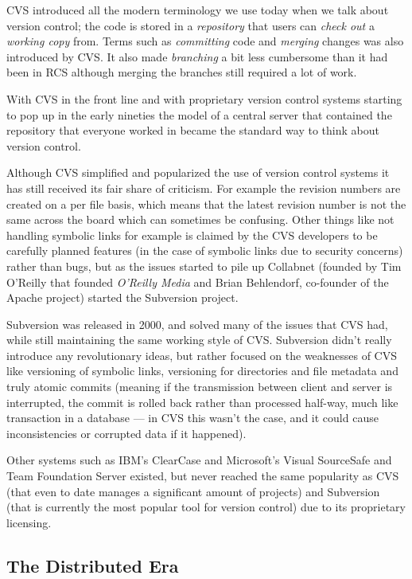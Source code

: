 \documentclass{llncs}
\begin{document}
CVS introduced all the modern terminology we use today when we talk
about version control; the code is stored in a \emph{repository} that
users can \emph{check out} a \emph{working copy} from. Terms such as
\emph{committing} code and \emph{merging} changes was also introduced
by CVS. It also made \emph{branching} a bit less cumbersome than it
had been in RCS although merging the branches still required a lot of
work.

With CVS in the front line and with proprietary version control
systems starting to pop up in the early nineties the model of a
central server that contained the repository that everyone worked in
became the standard way to think about version control.

Although CVS simplified and popularized the use of version control
systems it has still received its fair share of criticism. For example
the revision numbers are created on a per file basis, which means that
the latest revision number is not the same across the board which can
sometimes be confusing. Other things like not handling symbolic links
for example is claimed by the CVS developers to be carefully planned
features (in the case of symbolic links due to security concerns)
rather than bugs, but as the issues started to pile up Collabnet
(founded by Tim O'Reilly that founded \emph{O'Reilly Media} and Brian
Behlendorf, co-founder of the Apache project) started the Subversion
project.

Subversion was released in 2000, and solved many of the issues that
CVS had, while still maintaining the same working style of
CVS. Subversion didn't really introduce any revolutionary ideas, but
rather focused on the weaknesses of CVS like versioning of symbolic
links, versioning for directories and file metadata and truly atomic
commits (meaning if the transmission between client and server is
interrupted, the commit is rolled back rather than processed half-way,
much like transaction in a database --- in CVS this wasn't the case,
and it could cause inconsistencies or corrupted data if it happened).

Other systems such as IBM's ClearCase and Microsoft's Visual
SourceSafe and Team Foundation Server existed, but never reached the
same popularity as CVS (that even to date manages a significant amount
of projects) and Subversion (that is currently the most popular tool
for version control) due to its proprietary licensing.

\subsection{The Distributed Era}
\end{document}
